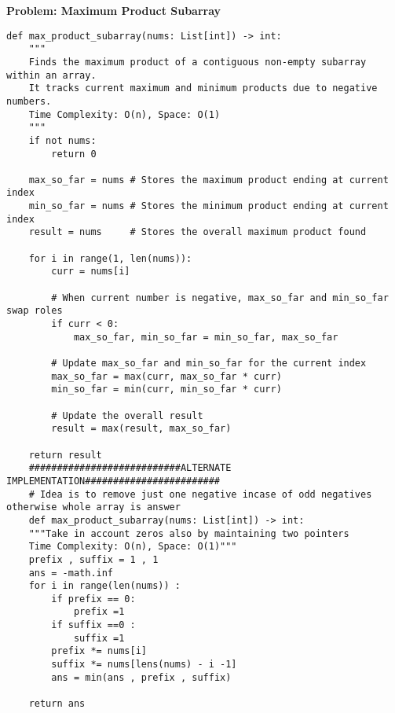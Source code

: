 \noindent\textbf{Problem: Maximum Product Subarray}
\begin{verbatim}
def max_product_subarray(nums: List[int]) -> int:
    """
    Finds the maximum product of a contiguous non-empty subarray within an array.
    It tracks current maximum and minimum products due to negative numbers.
    Time Complexity: O(n), Space: O(1)
    """
    if not nums:
        return 0

    max_so_far = nums # Stores the maximum product ending at current index
    min_so_far = nums # Stores the minimum product ending at current index
    result = nums     # Stores the overall maximum product found

    for i in range(1, len(nums)):
        curr = nums[i]
        
        # When current number is negative, max_so_far and min_so_far swap roles
        if curr < 0:
            max_so_far, min_so_far = min_so_far, max_so_far
        
        # Update max_so_far and min_so_far for the current index
        max_so_far = max(curr, max_so_far * curr)
        min_so_far = min(curr, min_so_far * curr)
        
        # Update the overall result
        result = max(result, max_so_far)
        
    return result
    ###########################ALTERNATE IMPLEMENTATION########################
    # Idea is to remove just one negative incase of odd negatives otherwise whole array is answer
    def max_product_subarray(nums: List[int]) -> int:
    """Take in account zeros also by maintaining two pointers
    Time Complexity: O(n), Space: O(1)"""
    prefix , suffix = 1 , 1
    ans = -math.inf
    for i in range(len(nums)) :
        if prefix == 0:
            prefix =1
        if suffix ==0 :
            suffix =1
        prefix *= nums[i]
        suffix *= nums[lens(nums) - i -1]
        ans = min(ans , prefix , suffix)

    return ans

\end{verbatim}

